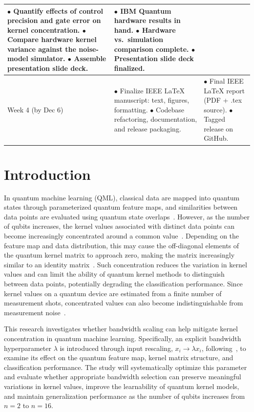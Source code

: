 \documentclass[conference]{IEEEtran}
\begin{document}
\begin{table}[t]
\begin{tabular}{@{}p{}p{}p{}@{}}
$\bullet$ Quantify effects of control precision and gate error on kernel concentration.\newline
$\bullet$ Compare hardware kernel variance against the noise-model simulator.\newline
$\bullet$ Assemble presentation slide deck. &
$\bullet$ IBM Quantum hardware results in hand.\newline
$\bullet$ Hardware vs.\ simulation comparison complete.\newline
$\bullet$ Presentation slide deck finalized. \\
\midrule
Week 4 (by Dec 6) &
$\bullet$ Finalize IEEE \LaTeX{} manuscript: text, figures, formatting.\newline
$\bullet$ Codebase refactoring, documentation, and release packaging. &
$\bullet$ Final IEEE \LaTeX{} report (PDF + .tex source).\newline
$\bullet$ Tagged release on GitHub. \\
\bottomrule
\end{tabular}
\end{table}

\section{Introduction}
In quantum machine learning (QML), classical data are mapped into quantum states through parameterized quantum feature maps, and similarities between data points are evaluated using quantum state overlaps~\cite{havlicek2019supervised}. However, as the number of qubits increases, the kernel values associated with distinct data points can become increasingly concentrated around a common value~\cite{thanasilp2024concentration}. Depending on the feature map and data distribution, this may cause the off-diagonal elements of the quantum kernel matrix to approach zero, making the matrix increasingly similar to an identity matrix~\cite{huang2021power}. Such concentration reduces the variation in kernel values and can limit the ability of quantum kernel methods to distinguish between data points, potentially degrading the classification performance. Since kernel values on a quantum device are estimated from a finite number of measurement shots, concentrated values can also become indistinguishable from measurement noise~\cite{thanasilp2024concentration}.

This research investigates whether bandwidth scaling can help mitigate kernel concentration in quantum machine learning. Specifically, an explicit bandwidth hyperparameter $\lambda$ is introduced through input rescaling, $x_i \rightarrow \lambda x_i$, following~\cite{shaydulin2022bandwidth}, to examine its effect on the quantum feature map, kernel matrix structure, and classification performance. The study will systematically optimize this parameter and evaluate whether appropriate bandwidth selection can preserve meaningful variations in kernel values, improve the learnability of quantum kernel models, and maintain generalization performance as the number of qubits increases from $n=2$ to $n=16$.
\end{document}
